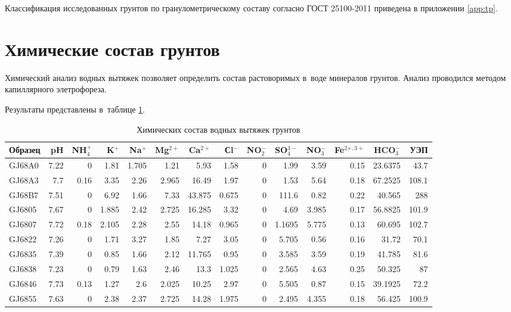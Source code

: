 Классификация исследованных грунтов по гранулометрическому составу согласно ГОСТ 25100-2011 приведена в приложении \ref{app:tp}.

 
\section{Химические состав грунтов}

Химический анализ водных вытяжек позволяет определить состав растоворимых в~воде минералов грунтов.
Анализ проводился методом капиллярного элетрофореза. 

Результаты представлены в~таблице \ref{tab:chem}.

\begin{table}[]
    \centering
    \tiny
    \caption{Химических состав водных вытяжек грунтов} \label{tab:chem}
    \begin{tabular}{@{}lrrrrrrrrrrrrr@{}}
    \toprule
    Образец & pH & NH$_4^+$ &	K$^+$ & Na$^+$ & Mg$^{2+}$ & Ca$^{2+}$ &	Сl$^-$ &	NO$_2^-$	   & SO$_4^{3-}$ &	NO$_3^-$ &	Fe$^{2+,3+}$ &	HCO$_3^-$   & УЭП \\ \midrule
    GJ68A0 & 7.22 & 0 & 1.81 & 1.705 & 1.21 & 5.93 & 1.58 & 0 & 1.99 & 3.59 & 0.15 & 23.6375 & 43.7 \\
    GJ68A3 & 7.7 & 0.16 & 3.35 & 2.26 & 2.965 & 16.49 & 1.97 & 0 & 1.53 & 5.64 & 0.18 & 67.2525 & 108.1 \\
    GJ68B7 & 7.51 & 0 & 6.92 & 1.66 & 7.33 & 43.875 & 0.675 & 0 & 111.6 & 0.82 & 0.22 & 40.565 & 288 \\
    GJ6805 & 7.67 & 0 & 1.885 & 2.42 & 2.725 & 16.285 & 3.32 & 0 & 4.69 & 3.985 & 0.17 & 56.8825 & 101.9 \\
    GJ6807 & 7.72 & 0.18 & 2.105 & 2.28 & 2.55 & 14.18 & 0.965 & 0 & 1.1695 & 5.775 & 0.13 & 60.695 & 102.7 \\
    GJ6822 & 7.26 & 0 & 1.71 & 3.27 & 1.85 & 7.27 & 3.05 & 0 & 5.705 & 0.56 & 0.16 & 31.72 & 70.1 \\
    GJ6835 & 7.39 & 0 & 0.85 & 1.66 & 2.12 & 11.765 & 0.95 & 0 & 3.585 & 3.59 & 0.19 & 41.785 & 81.6 \\
    GJ6838 & 7.23 & 0 & 0.79 & 1.63 & 2.46 & 13.3 & 1.025 & 0 & 2.565 & 4.63 & 0.25 & 50.325 & 87 \\
    GJ6846 & 7.73 & 0.13 & 1.27 & 2.6 & 2.025 & 10.25 & 2.97 & 0 & 5.505 & 0.87 & 0.15 & 39.1925 & 72.2 \\
    GJ6855 & 7.63 & 0 & 2.38 & 2.37 & 2.725 & 14.28 & 1.975 & 0 & 2.495 & 4.355 & 0.18 & 56.425 & 100.9 \\

\end{tabular}
\end{table}
